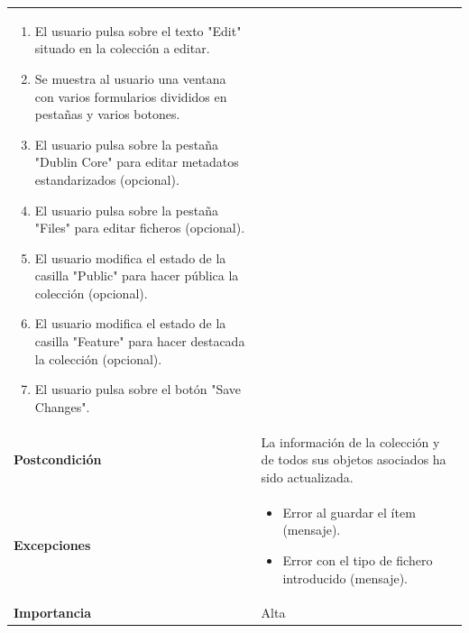 \documentclass[
]{article}
\providecommand{\tightlist}{%
  \setlength{\itemsep}{0pt}\setlength{\parskip}{0pt}}
\begin{document}
\begin{longtable}[]{@{}ll@{}}
\begin{minipage}[t]{0.75\columnwidth}
\begin{enumerate}
\tightlist
\item
  El usuario pulsa sobre el texto "Edit" situado en la colección a
  editar.
\item
  Se muestra al usuario una ventana con varios formularios divididos en
  pestañas y varios botones.
\item
  El usuario pulsa sobre la pestaña "Dublin Core" para editar metadatos
  estandarizados (opcional).
\item
  El usuario pulsa sobre la pestaña "Files" para editar ficheros
  (opcional).
\item
  El usuario modifica el estado de la casilla "Public" para hacer
  pública la colección (opcional).
\item
  El usuario modifica el estado de la casilla "Feature" para hacer
  destacada la colección (opcional).
\item
  El usuario pulsa sobre el botón "Save Changes".
\end{enumerate}\strut
\end{minipage}\tabularnewline
\begin{minipage}[t]{0.19\columnwidth}\raggedright
\textbf{Postcondición}\strut
\end{minipage} & \begin{minipage}[t]{0.75\columnwidth}\raggedright
La información de la colección y de todos sus objetos asociados ha sido
actualizada.\strut
\end{minipage}\tabularnewline
\begin{minipage}[t]{0.19\columnwidth}\raggedright
\textbf{Excepciones}\strut
\end{minipage} & \begin{minipage}[t]{0.75\columnwidth}\raggedright
\begin{itemize}
\tightlist
\item
  Error al guardar el ítem (mensaje).
\item
  Error con el tipo de fichero introducido (mensaje).
\end{itemize}\strut
\end{minipage}\tabularnewline
\begin{minipage}[t]{0.19\columnwidth}\raggedright
\textbf{Importancia}\strut
\end{minipage} & \begin{minipage}[t]{0.75\columnwidth}\raggedright
Alta\strut
\end{minipage}\tabularnewline
\bottomrule
\end{longtable}
\end{document}
